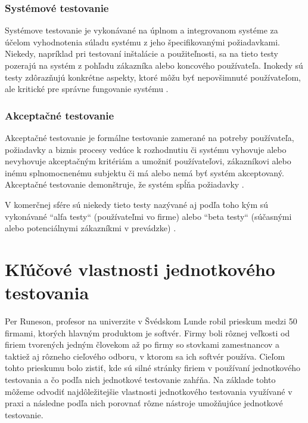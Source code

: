 \documentclass[11pt,twoside,slovak,a4paper]{article}
\begin{document}
		\subsubsection{Systémové testovanie} 
				
			Systémove testovanie je vykonávané na úplnom a integrovanom systéme za účelom vyhodnotenia súladu systému z jeho špecifikovanými požiadavkami\cite{Dictionary}. 
			Niekedy, napríklad pri testovaní inštalácie a použiteľnosti, sa na tieto testy pozerajú na systém z pohľadu zákazníka alebo koncového používateľa. Inokedy sú testy zdôrazňujú konkrétne aspekty, ktoré môžu byť nepovšimnuté používateľom, ale kritické pre správne fungovanie systému \cite{Alba2008}.
			
	\subsubsection{Akceptačné testovanie}	
	
			Akceptačné testovanie je formálne testovanie zamerané na potreby používateľa, požiadavky a  biznis procesy vedúce k rozhodnutiu či systému vyhovuje alebo nevyhovuje akceptačným kritériám a umožniť používateľovi, zákazníkovi alebo inému splnomocnenému subjektu či má alebo nemá byť systém akceptovaný\cite{Veenendaal2010}. Akceptačné testovanie demonštruje, že systém spĺňa požiadavky \cite{Alba2008}. 
			
			V komerčnej sfére sú niekedy tieto testy nazývané aj podľa toho kým sú vykonávané ``alfa testy`` (používateľmi vo firme) alebo ``beta testy`` (súčasnými alebo potenciálnymi zákazníkmi v prevádzke) \cite{Alba2008}.
	
	\newpage
	\thispagestyle{plain}
	\section{Kľúčové vlastnosti jednotkového testovania}
	
	Per Runeson, profesor na univerzite v Švédskom Lunde robil prieskum medzi 50 firmami, ktorých hlavným produktom je softvér\cite{Runeson2006}. Firmy boli rôznej veľkosti od firiem tvorených jedným človekom až po firmy so stovkami zamestnancov a taktiež aj rôzneho cieľového odboru, v ktorom sa ich softvér používa. Cieľom tohto prieskumu bolo zistiť, kde sú silné stránky firiem v používaní jednotkového testovania a čo podľa nich jednotkové testovanie zahŕňa. Na základe tohto môžeme odvodiť najdôležitejšie vlastnosti jednotkového testovania využívané v praxi a následne podľa nich porovnať rôzne nástroje umožňujúce jednotkové testovanie.
	
\end{document}
